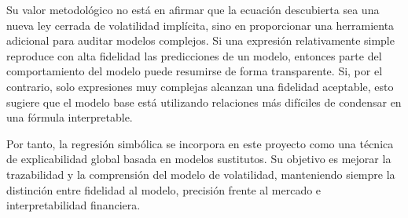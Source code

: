 Su valor metodológico no está en afirmar que la ecuación descubierta sea una nueva ley cerrada de volatilidad implícita, sino en proporcionar una herramienta adicional para auditar modelos complejos. Si una expresión relativamente simple reproduce con alta fidelidad las predicciones de un modelo, entonces parte del comportamiento del modelo puede resumirse de forma transparente. Si, por el contrario, solo expresiones muy complejas alcanzan una fidelidad aceptable, esto sugiere que el modelo base está utilizando relaciones más difíciles de condensar en una fórmula interpretable.

Por tanto, la regresión simbólica se incorpora en este proyecto como una técnica de explicabilidad global basada en modelos sustitutos. Su objetivo es mejorar la trazabilidad y la comprensión del modelo de volatilidad, manteniendo siempre la distinción entre fidelidad al modelo, precisión frente al mercado e interpretabilidad financiera.


